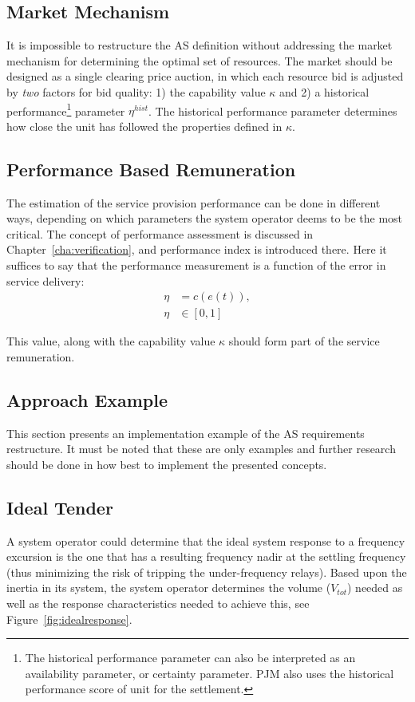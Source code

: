
\subsection*{Market Mechanism} %
\label{sub:MarketMechanism}
It is impossible to restructure the AS definition without addressing the market mechanism for determining the optimal set of resources. The market should be designed as a single clearing price auction, in which each resource bid is adjusted by \emph{two} factors for bid quality: 1) the capability value $\kappa$ and 2) a historical performance\footnote{The historical performance parameter can also be interpreted as an availability parameter, or certainty parameter. PJM also uses the historical performance score of unit for the settlement.} parameter $\eta^{hist}$. The historical performance parameter determines how close the unit has followed the properties defined in $\kappa$. 

\subsection*{Performance Based Remuneration} %
\label{sub:PerformanceBasedRemuneration}
The estimation of the service provision performance can be done in different ways, depending on which parameters the system operator deems to be the most critical. The concept of performance assessment is discussed in Chapter~\ref{cha:verification}, and performance index is introduced there. Here it suffices to say that the performance measurement is a function of the error in service delivery:
\begin{align}
	\eta &= c(e(t)), \label{eq:perfindexsimple}\\
	\eta &\in [0,1]
\end{align}

This value, along with the capability value $\kappa$ should form part of the service remuneration. 
\subsection{Approach Example} %
\label{sub:ApproachExample}
This section presents an implementation example of the AS requirements restructure. It must be noted that these are only examples and further research should be done in how best to implement the presented concepts.
\subsection*{Ideal Tender}
A system operator could determine that the ideal system response to a frequency excursion is the one that has a resulting frequency nadir at the settling frequency (thus minimizing the risk of tripping the under-frequency relays). Based upon the inertia in its system, the system operator determines the volume ($V_{tot}$) needed as well as the response characteristics needed to achieve this, see Figure~\ref{fig:idealresponse}.

